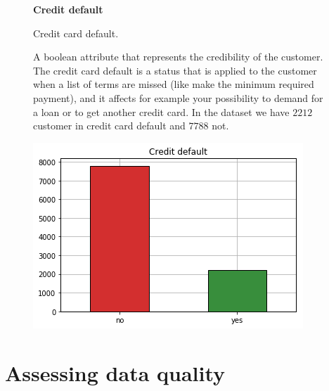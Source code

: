 \begin{figure}[ht]
  \begin{minipage}[h]{.50\textwidth}
        {\Large \textbf{Credit default}}
        
        Credit card default.
        
        A boolean attribute that represents the credibility of the customer.
        The credit card default is a status that is applied to the customer when a list of terms are missed (like make the minimum required payment), and it affects for example your possibility to demand for a loan or to get another credit card. In the dataset we have $2212$ customer in credit card default and $7788$ not. 
        
  \end{minipage}
  \begin{minipage}[h]{.50\textwidth}
    \includegraphics[width=.95\textwidth]{img/ch2/credit_default}
  \end{minipage}
\end{figure}

\clearpage

\section{Assessing data quality}

